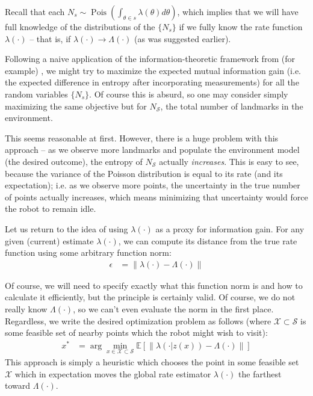 \documentclass[12pt]{article}
\DeclareMathOperator{\Pois}{Pois}
\begin{document}
Recall that each $N_s \sim \Pois \left( \int_{\theta \in s} \lambda(\theta) d\theta \right)$, which implies that we will have full knowledge of the distributions of the $\{N_s\}$ if we fully know the rate function $\lambda(\cdot)$ -- that is, if $\lambda(\cdot) \rightarrow \Lambda(\cdot)$ (as was suggested earlier).

Following a naive application of the information-theoretic framework from (for example) \cite{bourgault}, we might try to maximize the expected mutual information gain (i.e. the expected difference in entropy after incorporating measurements) for all the random variables $\{N_s\}$. Of course this is absurd, so one may consider simply maximizing the same objective but for $N_{\mathcal{S}}$, the total number of landmarks in the environment.

This seems reasonable at first. However, there is a huge problem with this approach -- as we observe more landmarks and populate the environment model (the desired outcome), the entropy of $N_{\mathcal{S}}$ actually \textit{increases}. This is easy to see, because the variance of the Poisson distribution is equal to its rate (and its expectation); i.e. as we observe more points, the uncertainty in the true number of points actually increases, which means minimizing that uncertainty would force the robot to remain idle.

Let us return to the idea of using $\lambda(\cdot)$ as a proxy for information gain. For any given (current) estimate $\lambda(\cdot)$, we can compute its distance from the true rate function using some arbitrary function norm:
\begin{align}
  \epsilon &= \|\lambda(\cdot) - \Lambda(\cdot)\|
\end{align}

Of course, we will need to specify exactly what this function norm is and how to calculate it efficiently, but the principle is certainly valid. Of course, we do not really know $\Lambda(\cdot)$, so we can't even evaluate the norm in the first place. Regardless, we write the desired optimization problem as follows (where $\mathcal{X} \subset \mathcal{S}$ is some feasible set of nearby points which the robot might wish to visit):
\begin{align}
  x^* &= \arg \min_{x \in \mathcal{X} \subset \mathcal{S}}
  \mathbb{E}[\|\lambda(\cdot | z(x)) - \Lambda(\cdot)\|]
\end{align}
This approach is simply a heuristic which chooses the point in some feasible set $\mathcal{X}$ which in expectation moves the global rate estimator $\lambda(\cdot)$ the farthest toward $\Lambda(\cdot)$.
\end{document}
